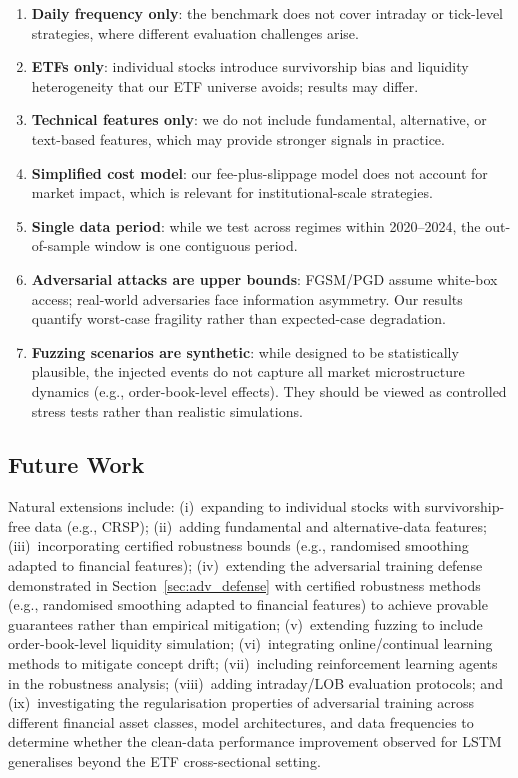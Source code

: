 \documentclass[preprint,review,12pt]{elsarticle}
\begin{document}
\begin{enumerate}[leftmargin=1.6em]
  \item \textbf{Daily frequency only}: the benchmark does not cover intraday or tick-level strategies, where different evaluation challenges arise.
  \item \textbf{ETFs only}: individual stocks introduce survivorship bias and liquidity heterogeneity that our ETF universe avoids; results may differ.
  \item \textbf{Technical features only}: we do not include fundamental, alternative, or text-based features, which may provide stronger signals in practice.
  \item \textbf{Simplified cost model}: our fee-plus-slippage model does not account for market impact, which is relevant for institutional-scale strategies.
  \item \textbf{Single data period}: while we test across regimes within 2020--2024, the out-of-sample window is one contiguous period.
  \item \textbf{Adversarial attacks are upper bounds}: FGSM/PGD assume white-box access; real-world adversaries face information asymmetry. Our results quantify worst-case fragility rather than expected-case degradation.
  \item \textbf{Fuzzing scenarios are synthetic}: while designed to be statistically plausible, the injected events do not capture all market microstructure dynamics (e.g., order-book-level effects). They should be viewed as controlled stress tests rather than realistic simulations.
\end{enumerate}

\subsection{Future Work}

Natural extensions include:
(i)~expanding to individual stocks with survivorship-free data (e.g., CRSP);
(ii)~adding fundamental and alternative-data features;
(iii)~incorporating certified robustness bounds (e.g., randomised smoothing adapted to financial features);
(iv)~extending the adversarial training defense demonstrated in Section~\ref{sec:adv_defense} with certified robustness methods (e.g., randomised smoothing adapted to financial features) to achieve provable guarantees rather than empirical mitigation;
(v)~extending fuzzing to include order-book-level liquidity simulation;
(vi)~integrating online/continual learning methods to mitigate concept drift;
(vii)~including reinforcement learning agents in the robustness analysis;
(viii)~adding intraday/LOB evaluation protocols;
and (ix)~investigating the regularisation properties of adversarial training across different financial asset classes, model architectures, and data frequencies to determine whether the clean-data performance improvement observed for LSTM generalises beyond the ETF cross-sectional setting.
\end{document}
